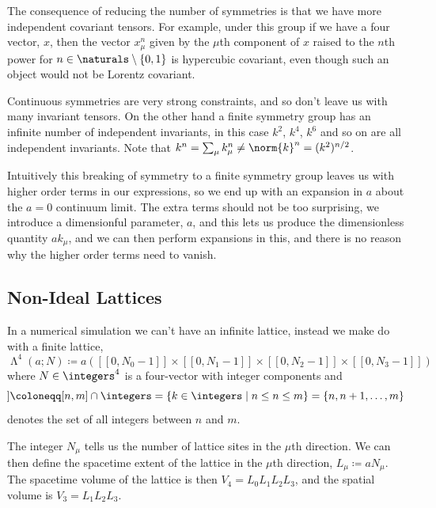 \documentclass[fleqn]{NotesClass}
\newcommand{\lattice}[1][4]{\upLambda^{#1}}
\newcommand{\integerRange}[2]{[\![#1, #2]\!]}
\begin{document}
    The consequence of reducing the number of symmetries is that we have more independent covariant tensors.
    For example, under this group if we have a four vector, \(x\), then the vector \(x_\mu^n\) given by the \(\mu\)th component of \(x\) raised to the \(n\)th power for \(n \in \naturals\setminus\{0, 1\}\) is hypercubic covariant, even though such an object would not be Lorentz covariant.
    
    Continuous symmetries are very strong constraints, and so don't leave us with many invariant tensors.
    On the other hand a finite symmetry group has an infinite number of independent invariants, in this case \(k^2\), \(k^4\), \(k^6\) and so on are all independent invariants.
    Note that \(k^n = \sum_{\mu} k_\mu^n \ne \norm{k}^n = (k^2)^{n/2}\).
    
    Intuitively this breaking of symmetry to a finite symmetry group leaves us with higher order terms in our expressions, so we end up with an expansion in \(a\) about the \(a = 0\) continuum limit.
    The extra terms should not be too surprising, we introduce a dimensionful parameter, \(a\), and this lets us produce the dimensionless quantity \(ak_\mu\), and we can then perform expansions in this, and there is no reason why the higher order terms need to vanish.
    
    \subsection{Non-Ideal Lattices}
    In a numerical simulation we can't have an infinite lattice, instead we make do with a finite lattice,
    \begin{equation}
        \lattice(a; N) \coloneqq a(\integerRange{0}{N_0 - 1} \times \integerRange{0}{N_1 - 1} \times \integerRange{0}{N_2 - 1} \times \integerRange{0}{N_3 - 1})
    \end{equation}
    where \(N \in \integers^4\) is a four-vector with integer components and
    \begin{equation}
        \integerRange{n}{m} \coloneqq [n, m] \cap \integers = \{k \in \integers \mid n \le n \le m\} = \{n, n + 1, \dotsc, m\}
    \end{equation}
    denotes the set of all integers between \(n\) and \(m\).
    
    The integer \(N_\mu\) tells us the number of lattice sites in the \(\mu\)th direction.
    We can then define the spacetime extent of the lattice in the \(\mu\)th direction, \(L_\mu \coloneqq aN_\mu\).
    The spacetime volume of the lattice is then \(V_4 = L_0L_1L_2L_3\), and the spatial volume is \(V_3 = L_1L_2L_3\).
    
\end{document}
